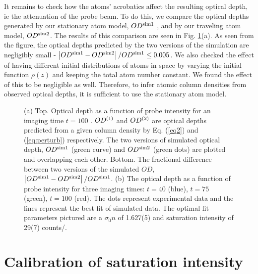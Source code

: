 It remains to check how the atoms' acrobatics affect the resulting optical depth, ie the attenuation of the probe beam. To do this, we compare the optical depths generated by our stationary atom model,  $OD^{\rm{sim1}}$ , and by our traveling atom model, $OD^{\rm{sim2}}$. The results of this comparison are seen in Fig. \ref{fig:compareModelsAndIsat}(a). As seen from the figure, the optical depths predicted by the two versions of the simulation are negligibly small -  $\left|OD^{\rm{sim1}}-OD^{\rm{sim2}}\right|/OD^{\rm{sim1}} \le 0.005$. We also checked the effect of having different initial distributions of atoms in space by varying the initial function $\rho(z)$ and keeping the total atom number constant. We found the effect of this to be negligible as well. Therefore, to infer atomic column densities from observed optical depths, it is sufficient to use the stationary atom model.



\begin{figure}
\caption[Comparison of stationary and moving atom simulations]{(a) Top. Optical depth as a function of probe intensity for an imaging time $t=100$ \us. $OD^{\rm{(1)}}$ and $OD^{\rm{(2)}}$ are optical depths predicted from a given column density by Eq. (\ref{eq2}) and (\ref{eq:perturb}) respectively.  The two versions of simulated optical depth, $OD^{\rm{sim1}}$ (green curve) and $OD^{\rm{sim2}}$ (green dots) are plotted and overlapping each other. Bottom. The fractional difference between two versions of the simulated $OD$, $\left|OD^{\rm{sim1}}-OD^{\rm{sim2}}\right|/OD^{\rm{sim1}}$. (b) The optical depth as a function of probe intensity for three imaging times: $t=40$ \us{} (blue),  $t=75$ \us{} (green),  $t=100$ \us{} (red). The dots represent experimental data and the lines represent the best fit of simulated data. The optimal fit parameters pictured are a $\sigma_0 n$ of 1.627(5) and saturation intensity of 29(7) counts/\us{}.}
\label{fig:compareModelsAndIsat}
\end{figure}


\section{Calibration of saturation intensity}


